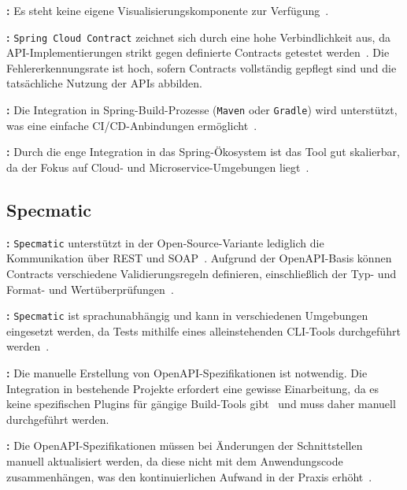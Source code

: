 \textbf{:} Es steht keine eigene Visualisierungskomponente zur Verfügung~\cite{SpringCloudContractb}.

\textbf{:} \texttt{Spring Cloud Contract} zeichnet sich durch eine hohe Verbindlichkeit aus, da \gls{API}-Implementierungen strikt gegen definierte Contracts getestet werden~\cite{SpringCloudContractb}.
Die Fehlererkennungsrate ist hoch, sofern Contracts vollständig gepflegt sind und die tatsächliche Nutzung der \glspl{API} abbilden.

\textbf{:} Die Integration in \gls{Spring}-\gls{Build}-Prozesse (\texttt{\gls{Maven}} oder \texttt{\gls{Gradle}}) wird unterstützt, was eine einfache \gls{CI}/\gls{CD}-Anbindungen ermöglicht~\cite{SpringCloudContractb}.

\textbf{:} Durch die enge Integration in das \gls{Spring}-Ökosystem ist das Tool gut skalierbar, da der Fokus auf Cloud- und Microservice-Umgebungen liegt~\cite{SpringCloudContractb}.


\subsection*{Specmatic}

\textbf{:} \texttt{Specmatic} unterstützt in der Open-Source-Variante lediglich die Kommunikation über \gls{REST} und \gls{SOAP}~\cite{ContractDrivenDevelopment}.
Aufgrund der \gls{OpenAPI}-Basis können Contracts verschiedene Validierungsregeln definieren, einschließlich der Typ- und Format- und Wertüberprüfungen~\cite{OpenAPIDocumentation}.

\textbf{:} \texttt{Specmatic} ist sprachunabhängig und kann in verschiedenen Umgebungen eingesetzt werden, da Tests mithilfe eines alleinstehenden \gls{CLI}-Tools durchgeführt werden~\cite{SpecmaticDocumentationContract}.

\textbf{:} Die manuelle Erstellung von \gls{OpenAPI}-Spezifikationen ist notwendig.
Die Integration in bestehende Projekte erfordert eine gewisse Einarbeitung, da es keine spezifischen Plugins für gängige \gls{Build}-Tools gibt~\cite{SpecmaticDocumentationContract} und muss daher manuell durchgeführt werden.

\textbf{:} Die \gls{OpenAPI}-Spezifikationen müssen bei Änderungen der Schnittstellen manuell aktualisiert werden, da diese nicht mit dem Anwendungscode zusammenhängen, was den kontinuierlichen Aufwand in der Praxis erhöht~\cite{SpecmaticDocumentationContract}.

